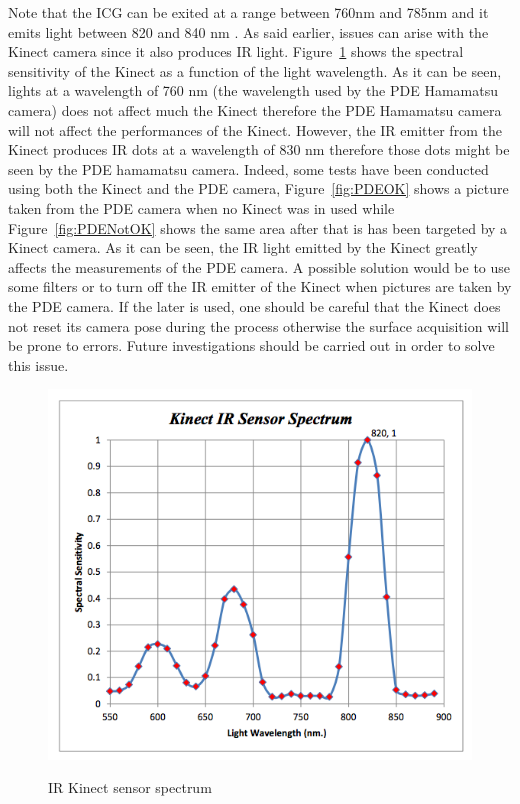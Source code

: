 Note that the ICG can be exited at a range between 760nm and 785nm and it emits light between 820 and 840 nm \cite{marshall_near-infrared_2010}. As said earlier, issues can arise with the Kinect camera since it also produces IR light. Figure~\ref{fig:kinectSpectrum} \cite{kolomenski_realization_2013} shows the spectral sensitivity of the Kinect as a function of the light wavelength. As it can be seen, lights at a wavelength of 760 nm (the wavelength used by the PDE Hamamatsu camera) does not affect much the Kinect therefore the PDE Hamamatsu camera will not affect the performances of the Kinect. However, the IR emitter from the Kinect produces IR dots at a wavelength of 830 nm \cite{kramer_introducing_2012} therefore those dots might be seen by the PDE hamamatsu camera. Indeed, some tests have been conducted using both the Kinect and the PDE camera, Figure~\ref{fig:PDEOK} shows a picture taken from the PDE camera when no Kinect was in used while Figure~\ref{fig:PDENotOK} shows the same area after that is has been targeted by a Kinect camera. As it can be seen, the IR light emitted by the Kinect greatly affects the measurements of the PDE camera. A possible solution would be to use some filters or to turn off the IR emitter of the Kinect when pictures are taken by the PDE camera. If the later is used, one should be careful that the Kinect does not reset its camera pose during the process otherwise the surface acquisition will be prone to errors. Future investigations should be carried out in order to solve this issue.\\
  
\begin{figure}
\caption{IR Kinect sensor spectrum}
\centering
    \includegraphics[width=1.0\textwidth]{images/kinectSpectrum.png}
\label{fig:kinectSpectrum}
\end{figure}

